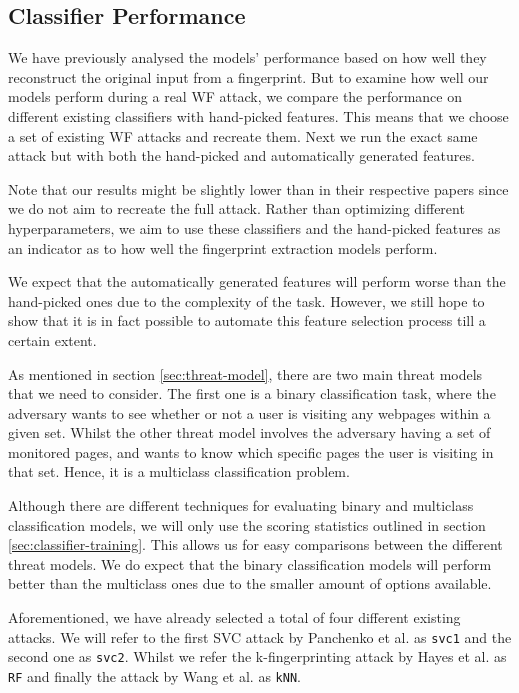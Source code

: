 \subsection{Classifier Performance}

We have previously analysed the models' performance based on how well they reconstruct the original input from a fingerprint.
But to examine how well our models perform during a real WF attack, we compare the performance on different existing classifiers with hand-picked features.
This means that we choose a set of existing WF attacks and recreate them.
Next we run the exact same attack but with both the hand-picked and automatically generated features.

Note that our results might be slightly lower than in their respective papers since we do not aim to recreate the full attack.
Rather than optimizing different hyperparameters, we aim to use these classifiers and the hand-picked features as an indicator as to how well the fingerprint extraction models perform.

We expect that the automatically generated features will perform worse than the hand-picked ones due to the complexity of the task.
However, we still hope to show that it is in fact possible to automate this feature selection process till a certain extent.

As mentioned in section \ref{sec:threat-model}, there are two main threat models that we need to consider.
The first one is a binary classification task, where the adversary wants to see whether or not a user is visiting any webpages within a given set.
Whilst the other threat model involves the adversary having a set of monitored pages, and wants to know which specific pages the user is visiting in that set.
Hence, it is a multiclass classification problem.

Although there are different techniques for evaluating binary and multiclass classification models, we will only use the scoring statistics outlined in section \ref{sec:classifier-training}.
This allows us for easy comparisons between the different threat models.
We do expect that the binary classification models will perform better than the multiclass ones due to the smaller amount of options available.

Aforementioned, we have already selected a total of four different existing attacks.
We will refer to the first SVC attack by Panchenko et al. \cite{panchenko1} as \texttt{svc1} and the second one \cite{panchenko2} as \texttt{svc2}.
Whilst we refer the k-fingerprinting attack by Hayes et al. \cite{kfingerprinting} as \texttt{RF} and finally the attack by Wang et al. \cite{wang_cai_johnson_nithyanand_goldberg_2014} as \texttt{kNN}.

